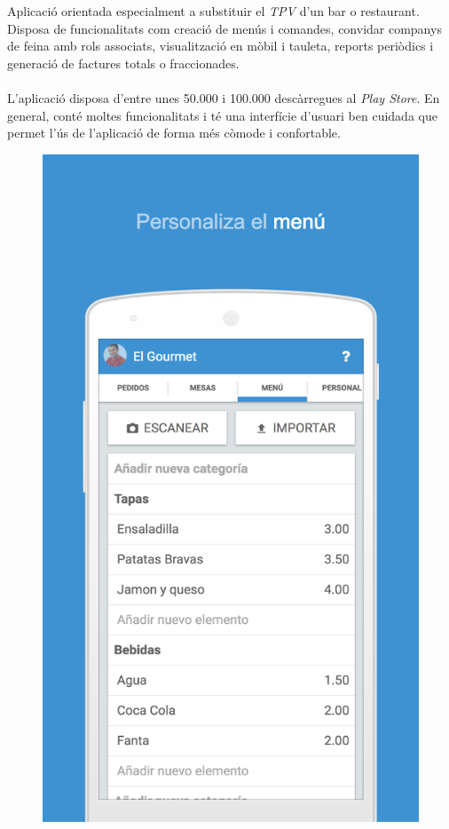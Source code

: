 Aplicació\cite{waiterio} orientada especialment a substituir el \textit{TPV} d'un bar o restaurant. Disposa de funcionalitats com creació de menús i comandes, convidar companys de feina amb rols associats, visualització en mòbil i tauleta, reports periòdics i generació de factures totals o fraccionades.
\\\\
L'aplicació disposa d'entre unes 50.000 i 100.000 descàrregues al \textit{Play Store}. En general, conté moltes funcionalitats i té una interfície d'usuari ben cuidada que permet l'ús de l'aplicació de forma més còmode i confortable.
\\
\begin{figure}[H]
\centering
\includegraphics[scale=0.15]{Figures/waitero-1.png}

\end{figure}
